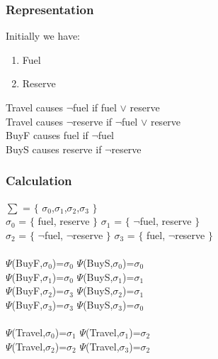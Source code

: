 \documentclass[11pt]{article}
\begin{document}
\subsubsection{Representation}\label{par:p201}
Initially we have:
\begin{enumerate}
\item Fuel
\item Reserve
\end{enumerate}
Travel causes $\neg$fuel if fuel $\vee$ reserve\\
Travel causes $\neg$reserve if $\neg$fuel $\vee$ reserve\\
BuyF causes fuel if $\neg$fuel\\ 
BuyS causes reserve if $\neg$reserve\\
\subsubsection{Calculation}\label{par:p301}\par
$\sum$ = $\lbrace$ $\sigma_{0}$,$\sigma_{1}$,$\sigma_{2}$,$\sigma_{3}$ $\rbrace$\\
$\sigma_{0}$ = $\lbrace$ fuel, reserve $\rbrace$ \indent $\sigma_{1}$ = $\lbrace$ $\neg$fuel, reserve $\rbrace$\\
$\sigma_{2}$ = $\lbrace$ $\neg$fuel, $\neg$reserve $\rbrace$ \indent $\sigma_{3}$ = $\lbrace$ fuel, $\neg$reserve $\rbrace$\\
\\
$\Psi$(BuyF,$\sigma_{0}$)=$\sigma_{0}$ \indent $\Psi$(BuyS,$\sigma_{0}$)=$\sigma_{0}$\\
$\Psi$(BuyF,$\sigma_{1}$)=$\sigma_{0}$ \indent $\Psi$(BuyS,$\sigma_{1}$)=$\sigma_{1}$\\
$\Psi$(BuyF,$\sigma_{2}$)=$\sigma_{3}$ \indent $\Psi$(BuyS,$\sigma_{2}$)=$\sigma_{1}$\\
$\Psi$(BuyF,$\sigma_{3}$)=$\sigma_{3}$ \indent $\Psi$(BuyS,$\sigma_{3}$)=$\sigma_{0}$\\
\\
$\Psi$(Travel,$\sigma_{0}$)=$\sigma_{1}$\indent
$\Psi$(Travel,$\sigma_{1}$)=$\sigma_{2}$\\
$\Psi$(Travel,$\sigma_{2}$)=$\sigma_{2}$\indent
$\Psi$(Travel,$\sigma_{3}$)=$\sigma_{2}$\\
\end{document}
